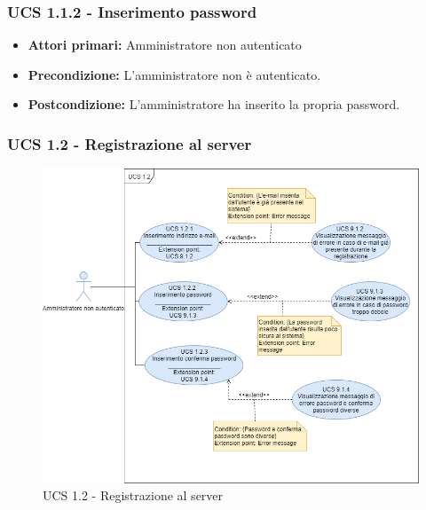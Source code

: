 \subsubsection{UCS 1.1.2 - Inserimento password}%
\begin{itemize}
\item \textbf{Attori primari:} Amministratore non autenticato
\item \textbf{Precondizione:} L'amministratore non è autenticato.
\item \textbf{Postcondizione:} L'amministratore ha inserito la propria password.
\end{itemize}

\subsubsection{UCS 1.2 - Registrazione al server}%

\begin{figure}[h]
  \centering
    \includegraphics[scale=0.5]{sezioni/UseCase/Immagini/UCS1.2.png}
  \caption{UCS 1.2 -  Registrazione al server}
\end{figure}

